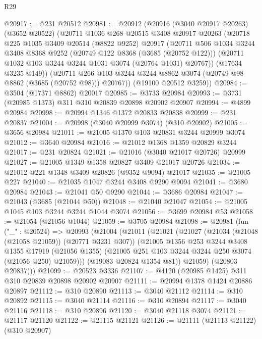 \begin{lexlean}{R29}
\begin{coremodule}
@20917 := @231 @20512
@20981 := @20912
    (@20916
      (@3040 @20917 @20263)
      (@3652 @20522)
      (@20711
        @1036
        @268
        @20515
        @3408
        @20917
        @20263
        (@20718
          @225
          @1035
          @3409
          @20514
          (@8822 @9252)
          @20917
          (@20711
            @506
            @1034
            @3244
            @3408
            @8368
            @9252
            (@20749 @122 @8368 (@3685 (@20752 @122)))
            (@20711 @1032 @103 @3244 @3244 @1031 @3074 (@20764 @1031) @20767))
          (@17634 @3235 @149))
        (@20711 @266 @103 @3244 @3244 @8862 @3074 (@20749 @98 @8862 (@3685 (@20752 @98))) @20767))
      (@19100 @20512 @3259))
@20984 := @3504 (@17371 @8862) @20017
@20985 := @3733 @20984
@20993 := @3731 (@20985 @1373) @311 @310 @20839 @20898 @20902 @20907
@20994 := @4899 @20984
@20998 := @20994 @1346 @1372 @20833 @20838
@20999 := @231 @20837
@21004 := @20998 (@3040 @20999 @3074) (@310 @20902)
@21005 := @3656 @20984
@21011 := @21005 @1370 @103 @20831 @3244 @20999 @3074
@21012 := @3640 @20984
@21016 := @21012 @1368 @1359 @20829 @3244
@21017 := @231 @20824
@21021 := @21016 (@3040 @21017 @20726) @20999
@21027 := @21005 @1349 @1358 @20827 @3409 @21017 @20726
@21034 := @21012 @221 @1348 @3409 @20826 (@9352 @9094) @21017
@21035 := @21005 @227
@21040 := @21035 @1047 @3244 @3408 @9290 @9094
@21041 := @3680 @20984
@21043 := @21041 @50 @9290
@21044 := @3686 @20984
@21047 := @21043 (@3685 (@21044 @50))
@21048 := @21040 @21047
@21054 := @21005 @1045 @103 @3244 @3244 @1044 @3074
@21056 := @3699 @20984 @53
@21058 := @21054 (@21056 @1044)
@21059 := @3705 @20984
@21098 := @20981
    (fun ("_" : @20524) =>
    @20993
      (@21004
        (@21011
          (@21021
            (@21027
              (@21034 (@21048 (@21058 @21059)) (@20771 @3231 @307))
              (@21005
                @1356
                @253
                @3244
                @3408
                @1355
                @17919
                (@21056 @1355)
                (@21005 @251 @103 @3244 @3244 @250 @3074 (@21056 @250) @21059)))
            (@19083 @20824 @1354 @81))
          @21059)
        (@20803 @20837)))
@21099 := @20523 @3336
@21107 := @4120 (@20985 @1425) @311 @310 @20839 @20898 @20902 @20907
@21111 := @20994 @1378 @1424 @20886 @20897
@21112 := @310 @20890
@21113 := @3040 @21112
@21114 := @310 @20892
@21115 := @3040 @21114
@21116 := @310 @20894
@21117 := @3040 @21116
@21118 := @310 @20896
@21120 := @3040 @21118 @3074
@21121 := @21117 @21120
@21122 := @21115 @21121
@21126 := @21111 (@21113 @21122) (@310 @20907)

\end{coremodule}
\end{lexlean}
